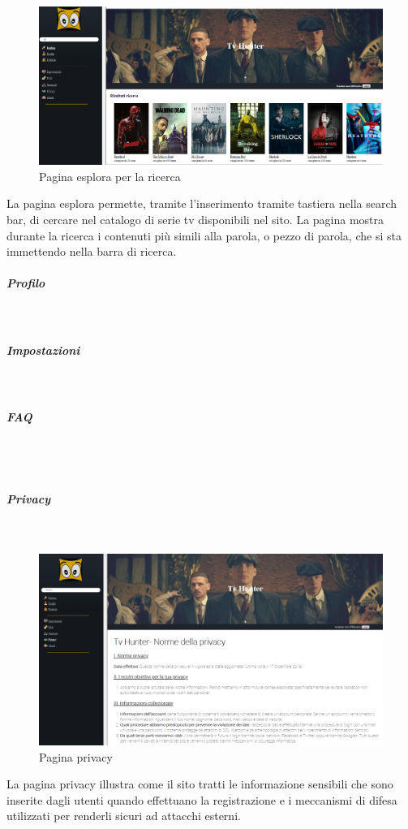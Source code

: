 \begin{figure}[H]
	\centerline{\includegraphics[scale=0.33]{img/esplora.png}}
	\caption{Pagina esplora per la ricerca}
	\label{fig:addForm}
\end{figure}	
La pagina esplora permette, tramite l'inserimento tramite tastiera nella search bar, di cercare nel catalogo di serie tv disponibili nel sito.
	La pagina mostra durante la ricerca i contenuti più simili alla parola, o pezzo di parola, che si sta immettendo nella barra di ricerca. 



\subparagraph{Profilo}
~\\


\subparagraph{Impostazioni} 
~\\

\subparagraph{FAQ} 
~\\

~\\
\subparagraph{Privacy}
~\\

\begin{figure}[H]
	\centerline{\includegraphics[scale= 0.4]{img/privacy.png}}
	\caption{Pagina privacy}
	
\end{figure}
La pagina privacy illustra come il sito tratti le informazione sensibili che sono inserite dagli utenti quando effettuano la registrazione e i meccanismi di difesa utilizzati per renderli sicuri ad attacchi esterni. 



